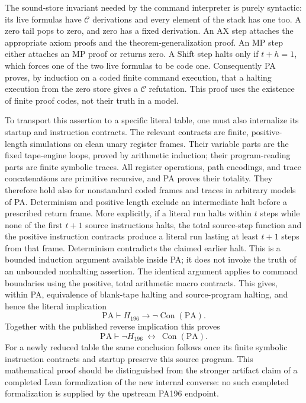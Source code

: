 The sound-store invariant needed by the command interpreter is purely
syntactic: its live formulas have $\mathcal C$ derivations and every
element of the stack has one too. A zero tail pops to zero, and zero has
a fixed derivation. An AX step attaches the appropriate axiom proofs
and the theorem-generalization proof. An MP step either attaches an
MP proof or returns zero. A Shift step halts only if $t+h=1$, which
forces one of the two live formulas to be code one.
Consequently PA proves, by induction on a coded finite command
execution, that a halting execution from the zero store gives a
$\mathcal C$ refutation. This proof uses the existence of finite proof
codes, not their truth in a model.

To transport this assertion to a specific literal table, one must also
internalize its startup and instruction contracts. The relevant
contracts are finite, positive-length simulations on clean unary
register frames. Their variable parts are the fixed tape-engine
loops, proved by arithmetic induction; their program-reading parts
are finite symbolic traces. All register operations, path encodings,
and trace concatenations are primitive recursive, and PA proves
their totality. They therefore hold also for nonstandard coded frames
and traces in arbitrary models of PA. Determinism and positive length
exclude an intermediate halt before a prescribed return frame. More
explicitly, if a literal run halts within $t$ steps while none of the
first $t+1$ source instructions halts, the total source-step function
and the positive instruction contracts produce a literal run lasting
at least $t+1$ steps from that frame. Determinism contradicts the
claimed earlier halt. This is a bounded induction argument available
inside PA; it does not invoke the truth of an unbounded nonhalting
assertion. The identical argument applies to command boundaries using
the positive, total arithmetic macro contracts. This
gives, within PA, equivalence of blank-tape halting and source-program
halting, and hence the literal implication
\[
 \mathrm{PA}\vdash H_{196}\longrightarrow
              \neg\operatorname{Con}(\mathrm{PA}).
\]
Together with the published reverse implication this proves
\[
 \mathrm{PA}\vdash
 \neg H_{196}\ \longleftrightarrow\ \operatorname{Con}(\mathrm{PA}).
\]
For a newly reduced table the same conclusion follows once its finite
symbolic instruction contracts and startup preserve this source
program. This mathematical proof should be distinguished from the
stronger artifact claim of a completed Lean formalization of the
new internal converse: no such completed formalization is supplied
by the upstream PA196 endpoint.

